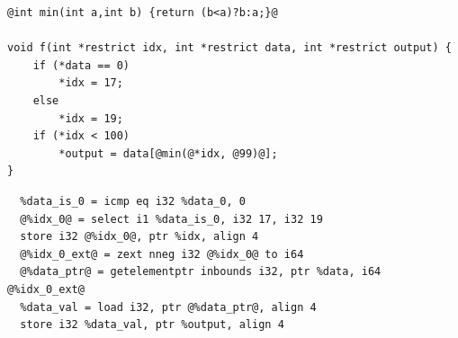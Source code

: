 
\begin{lstlisting}[float=t, caption={[C program exemplifying WGSL's data race specification vulnerability]Extension of \myfig\ref{fig:saferace-oob-example} showing a C program that exemplifies WGSL's data race specification vulnerability. Pointers are restricted to avoid aliasing, as in WGSL.}, label={list:saferace-c-code}, basicstyle=\ttfamily\fontsize{9.2}{13}\selectfont, xleftmargin=10pt, xrightmargin=10pt]
@int min(int a,int b) {return (b<a)?b:a;}@

void f(int *restrict idx, int *restrict data, int *restrict output) {
    if (*data == 0)
        *idx = 17;
    else
        *idx = 19;
    if (*idx < 100)
        *output = data[@min(@*idx, @99)@];
}
\end{lstlisting}


\begin{lstlisting}[float=t, caption={[Optimized LLVM intermediate representation]Compiler optimizations can turn the code in \mylisting\ref{list:saferace-c-code} into this LLVM intermediate representation.}, label={list:saferace-llvm-code}, basicstyle=\ttfamily\fontsize{9.8}{13}\selectfont, xleftmargin=10pt, xrightmargin=10pt]
  %data_0 = load i32, ptr %data, align 4
  %data_is_0 = icmp eq i32 %data_0, 0
  @%idx_0@ = select i1 %data_is_0, i32 17, i32 19
  store i32 @%idx_0@, ptr %idx, align 4
  @%idx_0_ext@ = zext nneg i32 @%idx_0@ to i64
  @%data_ptr@ = getelementptr inbounds i32, ptr %data, i64 @%idx_0_ext@
  %data_val = load i32, ptr @%data_ptr@, align 4
  store i32 %data_val, ptr %output, align 4
\end{lstlisting}

